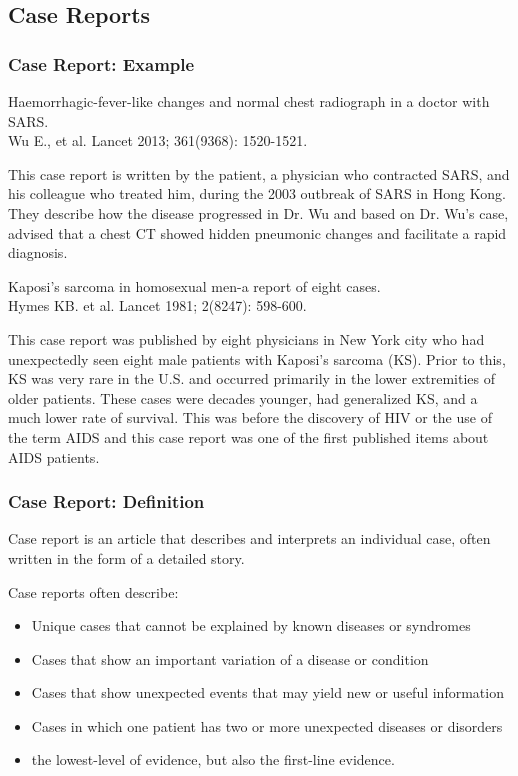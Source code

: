 \documentclass[table,10pt]{beamer}
\begin{document}
\begin{CJK*}{UTF8}{gbsn}
\section{Case Reports}

\begin{frame}[t]
\frametitle{Case Report: Example}
{\large \alert{Haemorrhagic-fever-like changes and normal chest radiograph in a doctor with SARS.}\\
\small{Wu E., et al. Lancet 2013; 361(9368): 1520-1521.}}

This case report is written by the patient, a physician who contracted SARS, 
and his colleague who treated him, during the 2003 outbreak of SARS in Hong Kong. 
They describe how the disease progressed in Dr. Wu and based on Dr. Wu’s case, 
advised that a chest CT showed hidden pneumonic changes and facilitate a rapid 
diagnosis.

{\large \alert{Kaposi's sarcoma in homosexual men-a report of eight cases.}}\\
\small{Hymes KB. et al. Lancet 1981; 2(8247): 598-600.}

This case report was published by eight physicians in New York city who had 
unexpectedly seen eight male patients with Kaposi’s sarcoma (KS). Prior to this, 
KS was very rare in the U.S. and occurred primarily in the lower extremities of 
older patients. These cases were decades younger, had generalized KS, and a much 
lower rate of survival. This was before the discovery of HIV or the use of the 
term AIDS and this case report was one of the first published items about AIDS 
patients.
\end{frame}


\begin{frame}[t]
\frametitle{Case Report: Definition}
Case report is an article that describes and interprets an individual case, often 
written in the form of a detailed story.

Case reports often describe:
\begin{itemize}
	\item Unique cases that cannot be explained by known diseases or syndromes
	\item Cases that show an important variation of a disease or condition
	\item Cases that show unexpected events that may yield new or useful information
	\item Cases in which one patient has two or more unexpected diseases or disorders
	\item the \alert{lowest-level} of evidence, but also the \alert{first-line} evidence.
\end{itemize}


\end{frame}
\end{CJK*}
\end{document}

